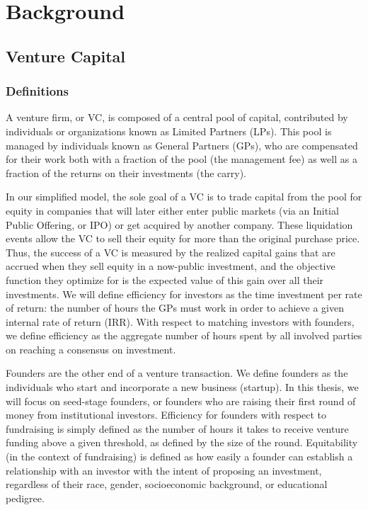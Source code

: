\chapter{Background}

\section{Venture Capital}

\subsection{Definitions}
\label{ch2:definitions}

A venture firm, or VC, is composed of a central pool of capital, contributed by individuals or organizations known as Limited Partners (LPs). This pool is managed by individuals known as General Partners (GPs), who are compensated for their work both with a fraction of the pool (the management fee) as well as a fraction of the returns on their investments (the carry).

In our simplified model, the sole goal of a VC is to trade capital from the pool for equity in companies that will later either enter public markets (via an Initial Public Offering, or IPO) or get acquired by another company. These liquidation events allow the VC to sell their equity for more than the original purchase price. Thus, the success of a VC is measured by the realized capital gains that are accrued when they sell equity in a now-public investment, and the objective function they optimize for is the expected value of this gain over all their investments. We will define efficiency for investors as the time investment per rate of return: the number of hours the GPs must work in order to achieve a given internal rate of return (IRR). With respect to matching investors with founders, we define efficiency as the aggregate number of hours spent by all involved parties on reaching a consensus on investment.

Founders are the other end of a venture transaction. We define founders as the individuals who start and incorporate a new business (startup). In this thesis, we will focus on seed-stage founders, or founders who are raising their first round of money from institutional investors. Efficiency for founders with respect to fundraising is simply defined as the number of hours it takes to receive venture funding above a given threshold, as defined by the size of the round. Equitability (in the context of fundraising) is defined as how easily a founder can establish a relationship with an investor with the intent of proposing an investment, regardless of their race, gender, socioeconomic background, or educational pedigree.

